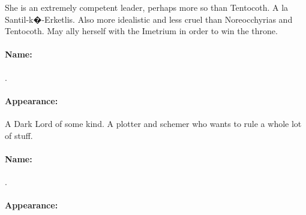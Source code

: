 She is an extremely competent leader, perhaps more so than Tentocoth. A la Santil-k�-Erketlis. Also more idealistic and less cruel than Noreocchyrias and Tentocoth. May ally herself with the Imetrium in order to win the throne. 

\paragraph{Name:}
.

\paragraph{Appearance:}



A Dark Lord of some kind. A plotter and schemer who wants to rule a whole lot of stuff. 

\paragraph{Name:}
.

\paragraph{Appearance:}



